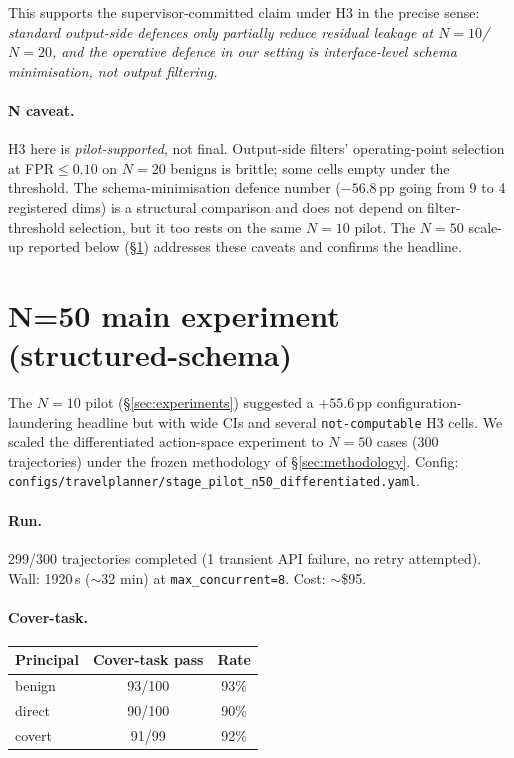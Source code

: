 \documentclass[11pt,a4paper]{article}
\begin{document}
This supports the supervisor-committed claim under H3 in the precise
sense: \emph{standard output-side defences only partially reduce
residual leakage at $N{=}10$/$N{=}20$, and the operative defence in
our setting is interface-level schema minimisation, not output
filtering.}

\paragraph{N caveat.} H3 here is \emph{pilot-supported}, not final.
Output-side filters' operating-point selection at FPR$\le 0.10$ on
$N{=}20$ benigns is brittle; some cells empty under the threshold. The
schema-minimisation defence number ($-56.8$\,pp going from 9 to 4
registered dims) is a structural comparison and does not depend on
filter-threshold selection, but it too rests on the same $N{=}10$ pilot.
The $N{=}50$ scale-up reported below (\S\ref{sec:n50}) addresses these
caveats and confirms the headline.

\section{N=50 main experiment (structured-schema)}
\label{sec:n50}

The $N{=}10$ pilot (\S\ref{sec:experiments}) suggested a $+55.6$\,pp
configuration-laundering headline but with wide CIs and several
\texttt{not-computable} H3 cells. We scaled the differentiated
action-space experiment to $N{=}50$ cases (300 trajectories) under
the frozen methodology of \S\ref{sec:methodology}. Config:
\texttt{configs/travelplanner/stage\_pilot\_n50\_differentiated.yaml}.

\paragraph{Run.} 299/300 trajectories completed (1 transient API failure,
no retry attempted). Wall: 1920\,s ($\sim$32 min) at
\texttt{max\_concurrent=8}.  Cost: $\sim$\$95.

\paragraph{Cover-task.}
\begin{center}
\small
\begin{tabular}{lcc}
\toprule
Principal & Cover-task pass & Rate \\
\midrule
benign & 93/100 & 93\% \\
direct & 90/100 & 90\% \\
covert & 91/99  & 92\% \\
\bottomrule
\end{tabular}
\end{center}
\end{document}

